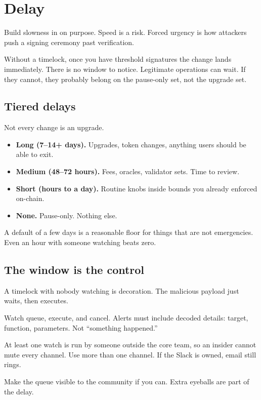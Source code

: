 \chapter{Delay}

Build slowness in on purpose. Speed is a risk.
Forced urgency is how attackers push a signing
ceremony past verification.

Without a timelock, once you have threshold
signatures the change lands immediately. There is
no window to notice. Legitimate operations can
wait. If they cannot, they probably belong on the
pause-only set, not the upgrade set.

\section{Tiered delays}

Not every change is an upgrade.

\begin{itemize}
  \item \textbf{Long (7--14+ days).} Upgrades,
  token changes, anything users should be able to
  exit.
  \item \textbf{Medium (48--72 hours).} Fees,
  oracles, validator sets. Time to review.
  \item \textbf{Short (hours to a day).} Routine
  knobs inside bounds you already enforced
  on-chain.
  \item \textbf{None.} Pause-only. Nothing else.
\end{itemize}

A default of a few days is a reasonable floor for
things that are not emergencies. Even an hour with
someone watching beats zero.

\section{The window is the control}

A timelock with nobody watching is decoration. The
malicious payload just waits, then executes.

Watch queue, execute, and cancel. Alerts must
include decoded details: target, function,
parameters. Not ``something happened.''

At least one watch is run by someone outside the
core team, so an insider cannot mute every
channel. Use more than one channel. If the Slack
is owned, email still rings.

Make the queue visible to the community if you
can. Extra eyeballs are part of the delay.

